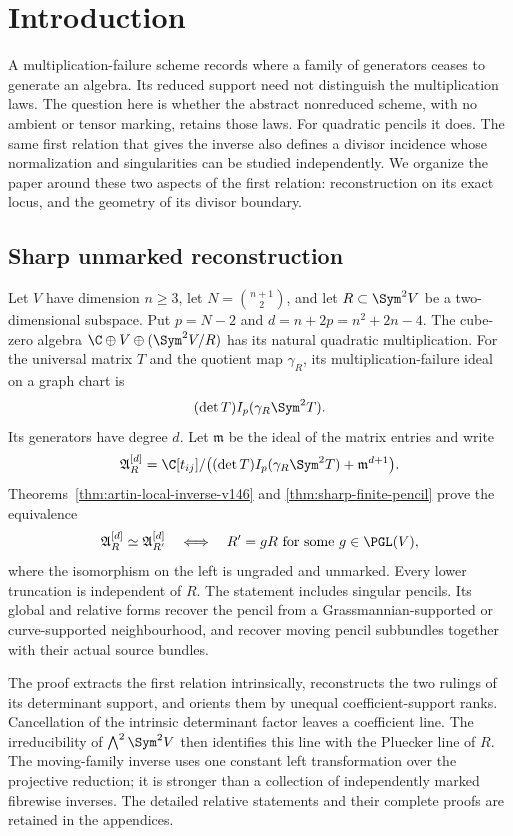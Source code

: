 \section{Introduction}
\label{sec:introduction-v153}
A multiplication-failure scheme records where a family of generators
ceases to generate an algebra. Its reduced support need not distinguish
the multiplication laws. The question here is whether the abstract
nonreduced scheme, with no ambient or tensor marking, retains those
laws. For quadratic pencils it does. The same first relation that gives
the inverse also defines a divisor incidence whose normalization and
singularities can be studied independently. We organize the paper around
these two aspects of the first relation: reconstruction on its exact
locus, and the geometry of its divisor boundary.

\subsection{Sharp unmarked reconstruction}
Let $V$ have dimension $n\geq3$, let $N=\binom{n+1}{2}$, and let
$R\subset\Sym^2V$ be a two-dimensional subspace. Put $p=N-2$ and
$d=n+2p=n^2+2n-4$. The cube-zero algebra
$\C\oplus V\oplus(\Sym^2V/R)$ has its natural quadratic multiplication.
For the universal matrix $T$ and the quotient map $\gamma_R$, its
multiplication-failure ideal on a graph chart is
\[
       (\det T) I_p(\gamma_R\Sym^2T).
\]
Its generators have degree $d$. Let $\mathfrak m$ be the ideal of the
matrix entries and write
\[
 \mathfrak A_R^{[d]}=
 \C[t_{ij}]/\bigl((\det T)I_p(\gamma_R\Sym^2T)+\mathfrak m^{d+1}\bigr).
\]
Theorems~\ref{thm:artin-local-inverse-v146} and
\ref{thm:sharp-finite-pencil} prove the equivalence
\[
 \mathfrak A_R^{[d]}\simeq\mathfrak A_{R'}^{[d]}
 \quad\Longleftrightarrow\quad
 R'=gR\text{ for some }g\in\PGL(V),
\]
where the isomorphism on the left is ungraded and unmarked. Every lower
truncation is independent of $R$. The statement includes singular
pencils. Its global and relative forms recover the pencil from a
Grassmannian-supported or curve-supported neighbourhood, and recover
moving pencil subbundles together with their actual source bundles.

The proof extracts the first relation intrinsically, reconstructs the
two rulings of its determinant support, and orients them by unequal
coefficient-support ranks. Cancellation of the intrinsic determinant
factor leaves a coefficient line. The irreducibility of
$\bigwedge^2\Sym^2V$ then identifies this line with the Pluecker line
of $R$. The moving-family inverse uses one constant left transformation
over the projective reduction; it is stronger than a collection of
independently marked fibrewise inverses. The detailed relative statements
and their complete proofs are retained in the appendices.

